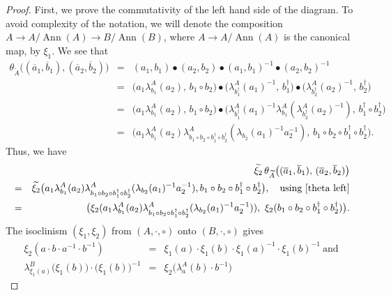\documentclass{jonasart}
\theoremstyle{plain}
\DeclareMathOperator{\Ann}{Ann}
\begin{document}
\begin{proof}
		First, we prove the commutativity of the left hand side of the diagram. To avoid complexity of the notation, we will denote the composition $A\to A/\Ann(A)\to B/\Ann(B)$, where $A\to A/\Ann(A)$ is the canonical map, by $\xi_1$. We see that
		\begin{eqnarray}
			\theta_{\widetilde{A}} \big((\overline{a}_1,\overline{b}_1 ), (\overline{a}_2,\overline{b}_2 ) \big)&=&(a_1,b_1 ) \bullet (a_2,b_2 ) \bullet (a_1,b_1 )^{-1}\bullet (a_2,b_2 )^{-1}\nonumber\\
			&=& \big(a_1\lambda^A_{b_1}(a_2 ), \,b_1\circ b_2 \big)\bullet \big(\lambda^A_{b_1^\dagger}(a_1 )^{-1}, \,b_1^\dagger \big)\bullet \big(\lambda^A_{b_2^\dagger}(a_2 )^{-1}, \,b_2^\dagger \big)\nonumber\\
			&=& \big(a_1\lambda^A_{b_1}(a_2 ), \,b_1\circ b_2 \big)\bullet \big(\lambda^A_{b_1^\dagger}(a_1 )^{-1}\lambda^A_{b_1}(\lambda^A_{b_2^\dagger}(a_2 )^{-1}), \,b_1^\dagger\circ b_2^\dagger \big)\nonumber\\
			&=&\big(a_1\lambda^A_{b_1}(a_2 )\lambda^A_{b_1\circ b_2\circ b_1^\dagger\circ b_2^\dagger}(\lambda_{b_2}(a_1 )^{-1} a_2^{-1}), \,b_1\circ b_2\circ b_1^\dagger\circ b_2^\dagger\big)\label{theta left}.
		\end{eqnarray}
		Thus, we have
		\begin{eqnarray}
			&& \widetilde{\xi_2} \, \theta_{\widetilde{A}} \big((\overline{a}_1,\overline{b}_1 ), \, (\overline{a}_2,\overline{b}_2 ) \big)\nonumber\\
			&=&\widetilde{\xi_2}\big(a_1\lambda^A_{b_1}(a_2 )\lambda^A_{b_1\circ b_2\circ b_1^\dagger\circ b_2^\dagger}(\lambda_{b_2}(a_1 )^{-1} a_2^{-1}), b_1\circ b_2\circ b_1^\dagger\circ b_2^\dagger\big),\quad \text{using~\eqref{theta left}}\nonumber\\
			&=&\big(\xi_2 (a_1\lambda^A_{b_1}(a_2 )\lambda^A_{b_1\circ b_2\circ b_1^\dagger\circ b_2^\dagger}(\lambda_{b_2}(a_1 )^{-1} a_2^{-1})),~\xi_2 (b_1\circ b_2\circ b_1^\dagger\circ b_2^\dagger)\big)\label{theta left 1}.
		\end{eqnarray}
		The isoclinism $(\xi_1, \xi_2)$ from $(A, \cdot, \circ)$ onto $(B, \cdot, \circ)$ gives
		\begin{eqnarray}
			\xi_2 (a\cdot b\cdot a^{-1}\cdot b^{-1}) &= &\xi_1 (a)\cdot \xi_1 (b)\cdot \xi_1 (a)^{-1}\cdot\xi_1 (b)^{-1} \label{sbisoclinism xi1}~\textrm{and}\\
			\lambda^B_{\xi_1 (a)} \big(\xi_1 (b)\big) \cdot \big(\xi_1 (b) \big)^{-1} &=& \xi_2 \big(\lambda^A_a (b) \cdot b^{-1} \big)\label{sbisoclinism xi2}

\end{eqnarray}
\end{proof}
\end{document}
